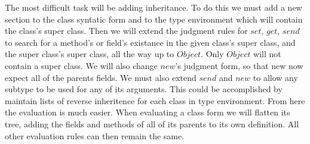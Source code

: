 \documentclass[]{letter}
\begin{document}
The most difficult task will be adding inheritance.
To do this we must add a new section to the class syntatic form and to the type environment which will contain the class's super class.
Then we will extend the judgment rules for $set$, $get$, $send$ to search for a method's or field's existance in the given class's super class, and the super class's super class, all the way up to $Object$.
Only $Object$ will not contain a super class.
We will also change $new$'s judgment form, so that new now expect all of the parents fields.
We must also extend $send$ and $new$ to allow any subtype to be used for any of its arguments. %
This could be accomplished by maintain lists of reverse inheritence for each class in type environment.
From here the evaluation is much easier.
When evaluating a class form we will flatten its tree, adding the fields and methods of all of its parents to its own definition.
All other evaluation rules can then remain the same.
\end{document}
